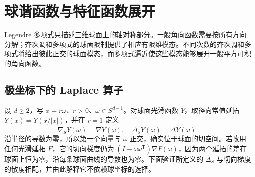 \section{球谐函数与特征函数展开}
\label{b2:sec:B203}

Legendre 多项式只描述三维球面上的轴对称部分。一般角向函数需要按所有方向分解；齐次调和多项式的球面限制提供了相应有限维模态。不同次数的齐次调和多项式将给出彼此正交的球面模态，而多项式逼近使这些模态能够展开一般平方可积的角向函数。

\subsection{极坐标下的 Laplace 算子}
\label{b2:subsec:B20301}

设 \(d\geq2\)，写 \(x=r\omega\)、\(r>0\)、\(\omega\in S^{d-1}\)。对球面光滑函数 \(Y\)，取径向常值延拓
\(\widetilde Y(x)=Y(x/|x|)\)，并在 \(r=1\) 定义
\[
 \nabla_SY(\omega)=\nabla\widetilde Y(\omega),
 \quad
 \Delta_SY(\omega)=\Delta\widetilde Y(\omega).
\]
沿半径的导数为零，所以第一个向量与 \(\omega\) 正交，确实位于球面的切空间。若改用任何光滑延拓 \(F\)，它的切向梯度仍为
\((I-\omega\omega^{\mathsf T})\nabla F(\omega)\)，因为两个延拓的差在球面上恒为零，沿每条球面曲线的导数也为零。下面验证所定义的 \(\Delta_S\) 与切向梯度的散度相配，并由此解释它不依赖球坐标的选择。

